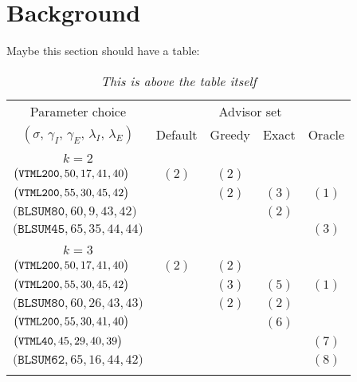 
\section{Background}
\label{sec:ch1:background}

Maybe this section should have a table:


\begin{table}	
\centering
\caption[This is what ends up in the list of tables]{
\emph{This is above the table itself}}
\label{table:consistency}
\small
\begin{tabular}{lcccc}
\hline
\hline
\multicolumn{1}{c}{Parameter choice}
  & \multicolumn{4}{c}{Advisor set} \\
\multicolumn{1}{c}{$(\sigma,\,\gamma_I,\,\gamma_E,\,\lambda_I,\,\lambda_E)$}
  & \multicolumn{1}{c}{\scriptsize Default}
  & \multicolumn{1}{c}{\scriptsize Greedy}
  & \multicolumn{1}{c}{\scriptsize Exact}
  & \multicolumn{1}{c}{\scriptsize Oracle} \\
\hline
\\[.5ex]
\multicolumn{1}{c}{$k = 2$} & \multicolumn{4}{l}{} \\
\hline
$\bigl(\texttt{VTML}\texttt{200},	50,	17,	41,	40\bigr)$   &	$(2)$ 	&	$(2)$  	&	    	&		\\
$\bigl(\texttt{VTML}\texttt{200},	55,	30,	45,	42\bigr)$   &		&	$(2)$	&	$(3)$ 	&	$(1)$	\\
$\bigl(\texttt{BLSUM}\texttt{80},	60,	9,	43,	42\bigr)$   &		&		&	$(2)$	&		\\
$\bigl(\texttt{BLSUM}\texttt{45}, 65, 35, 44, 44\bigr)$ 		  &		&		&	    	&	$(3)$	\\
\hline
\\[.5ex]
\multicolumn{1}{c}{$k = 3$} & \multicolumn{4}{l}{} \\
\hline
$\bigl(\texttt{VTML}\texttt{200}, 50, 17, 41, 40\bigr)$	  	&	$(2)$	&	$(2)$	&		&		\\
$\bigl(\texttt{VTML}\texttt{200}, 55, 30, 45, 42\bigr)$	 	&		&	$(3)$	&	$(5)$ 	&	$(1)$	\\
$\bigl(\texttt{BLSUM}\texttt{80}, 60, 26, 43, 43\bigr)$ 	&		&	$(2)$	&	$(2)$	&		\\
$\bigl(\texttt{VTML}\texttt{200}, 55, 30, 41, 40\bigr)$	 	&		&		&	$(6)$	&		\\
$\bigl(\texttt{VTML}\texttt{40}, 45, 29, 40, 39\bigr)$		&		&		&		&	$(7)$	\\
$\bigl(\texttt{BLSUM}\texttt{62}, 65, 16, 44, 42\bigr)$ 	&		&		&		&	$(8)$	\\
\hline
\\[.5ex]

\end{tabular}
\end{table}
